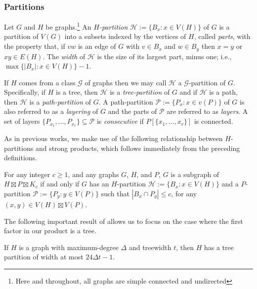 \documentclass{patmorin}
\newcommand{\defin}[1]{\emph{\color{brightmaroon}#1}}
\begin{document}
\subsubsection{Partitions}

Let $G$ and $H$ be graphs.\footnote{Here and throughout, all graphs are simple connected and undirected}  An \defin{$H$-partition} $\mathcal{H}:=\{B_x:x\in V(H)\}$ of $G$ is a partition  of $V(G)$ into a subsets indexed by the vertices of $H$, called \defin{parts}, with the property that, if $vw$ is an edge of $G$ with $v\in B_x$ and $w\in B_y$ then $x=y$ or $xy\in E(H)$.  The \defin{width} of $\mathcal{H}$ is the size of its largest part, minus one; i.e., $\max\{|B_x|:x\in V(H)\}-1$.

If $H$ comes from a class $\mathcal{G}$ of graphs then we may call $\mathcal{H}$ a $\mathcal{G}$-partition of $G$.  Specifically, if $H$ is a tree, then $\mathcal{H}$ is a \defin{tree-partition} of $G$ and if $\mathcal{H}$ is a path, then $\mathcal{H}$ is a \defin{path-partition} of $G$.  A path-partition $\mathcal{P}:=\{P_x:x\in v(P)\}$ of $G$ is also referred to as a \defin{layering} of $G$ and the parts of $\mathcal{P}$ are referred to as \defin{layers}.  A set of layers $\{P_{x_1},\ldots,P_{x_r}\}\subseteq\mathcal{P}$ is \defin{consecutive} if $P[\{x_1,\ldots,x_r\}]$ is connected.


As in previous works, we make use of the following relationship between $H$-partitions and strong products, which follows immediately from the preceding definitions.

\begin{obs}\label{partitions_vs_products}
  For any integer $c\ge 1$, and any graphs $G$, $H$, and $P$,  $G$ is a subgraph of $H\boxtimes P\boxtimes K_c$ if and only if $G$ has an $H$-partition $\mathcal{H}:=\{B_x:x\in V(H)\}$ and a $P$-partition $\mathcal{P}:=\{P_y:y\in V(P)\}$ such that $|B_x\cap P_y|\le c$, for any $(x,y)\in V(H)\boxtimes V(P)$.
\end{obs}


The following important result of \citet{ding.oporowski:some} allows us to focus on the case where the first factor in our product is a tree.

\begin{lem}\label{dingy}
  If $H$ is a graph with maximum-degree $\Delta$ and treewidth $t$, then $H$ has a tree partition of width at most $24\Delta t-1$.
\end{lem}
\end{document}
